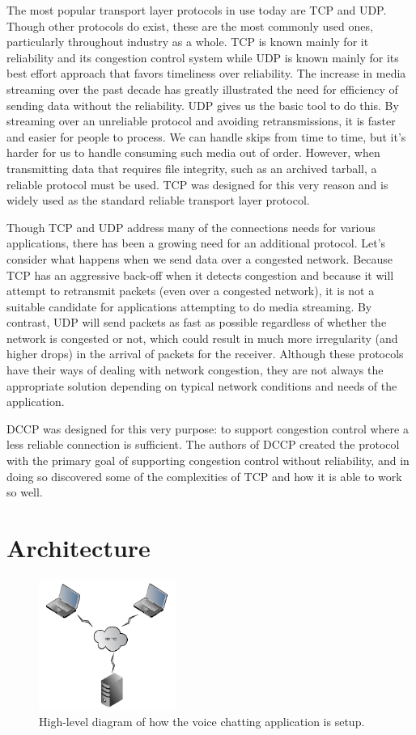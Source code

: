 \documentclass[letterpaper, 9 pt, balance, conference]{ieeeconf}
\begin{document}
The most popular transport layer protocols in use today are TCP and UDP. Though other protocols do exist, these are the most commonly used ones, particularly throughout industry as a whole. TCP is known mainly for it reliability and its congestion control system while UDP is known mainly for its best effort approach that favors timeliness over reliability. The increase in media streaming over the past decade has greatly illustrated the need for efficiency of sending data without the reliability. UDP gives us the basic tool to do this. By streaming over an unreliable protocol and avoiding retransmissions, it is faster and easier for people to process. We can handle skips from time to time, but it's harder for us to handle consuming such media out of order. However, when transmitting data that requires file integrity, such as an archived tarball, a reliable protocol must be used. TCP was designed for this very reason and is widely used as the standard reliable transport layer protocol.

Though TCP and UDP address many of the connections needs for various applications, there has been a growing need for an additional protocol. Let's consider what happens when we send data over a congested network. Because TCP has an aggressive back-off when it detects congestion and because it will attempt to retransmit packets (even over a congested network), it is not a suitable candidate for applications attempting to do media streaming. By contrast, UDP will send packets as fast as possible regardless of whether the network is congested or not, which could result in much more irregularity (and higher drops) in the arrival of packets for the receiver. Although these protocols have their ways of dealing with network congestion, they are not always the appropriate solution depending on typical network conditions and needs of the application.

DCCP was designed for this very purpose: to support congestion control where a less reliable connection is sufficient. The authors of DCCP created the protocol with the primary goal of supporting congestion control without reliability, and in doing so discovered some of the complexities of TCP and how it is able to work so well.

\section{Architecture}
\label{sec:architec}

\begin{figure}[h]
   \centering
      \includegraphics[width=0.4\textwidth]{pics/setup}
   \caption{High-level diagram of how the voice chatting application is setup.}
\label{fig:setup}
\end{figure}
\end{document}
